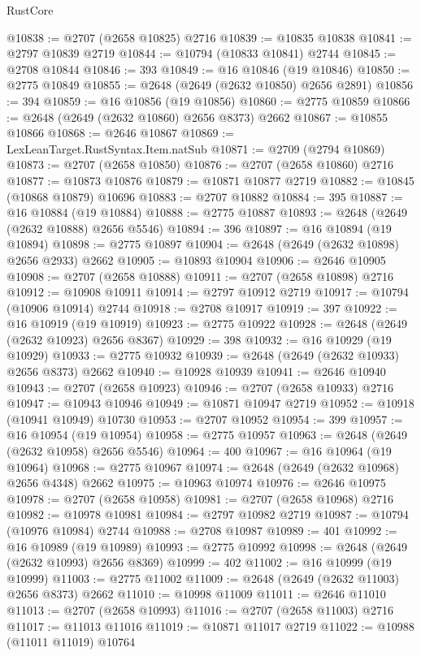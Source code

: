 \begin{lexlean}{RustCore}
\begin{coremodule}
@10838 := @2707 (@2658 @10825) @2716
@10839 := @10835 @10838
@10841 := @2797 @10839 @2719
@10844 := @10794 (@10833 @10841) @2744
@10845 := @2708 @10844
@10846 := 393
@10849 := @16 @10846 (@19 @10846)
@10850 := @2775 @10849
@10855 := @2648 (@2649 (@2632 @10850) @2656 @2891)
@10856 := 394
@10859 := @16 @10856 (@19 @10856)
@10860 := @2775 @10859
@10866 := @2648 (@2649 (@2632 @10860) @2656 @8373) @2662
@10867 := @10855 @10866
@10868 := @2646 @10867
@10869 := LexLeanTarget.RustSyntax.Item.natSub
@10871 := @2709 (@2794 @10869)
@10873 := @2707 (@2658 @10850)
@10876 := @2707 (@2658 @10860) @2716
@10877 := @10873 @10876
@10879 := @10871 @10877 @2719
@10882 := @10845 (@10868 @10879) @10696
@10883 := @2707 @10882
@10884 := 395
@10887 := @16 @10884 (@19 @10884)
@10888 := @2775 @10887
@10893 := @2648 (@2649 (@2632 @10888) @2656 @5546)
@10894 := 396
@10897 := @16 @10894 (@19 @10894)
@10898 := @2775 @10897
@10904 := @2648 (@2649 (@2632 @10898) @2656 @2933) @2662
@10905 := @10893 @10904
@10906 := @2646 @10905
@10908 := @2707 (@2658 @10888)
@10911 := @2707 (@2658 @10898) @2716
@10912 := @10908 @10911
@10914 := @2797 @10912 @2719
@10917 := @10794 (@10906 @10914) @2744
@10918 := @2708 @10917
@10919 := 397
@10922 := @16 @10919 (@19 @10919)
@10923 := @2775 @10922
@10928 := @2648 (@2649 (@2632 @10923) @2656 @8367)
@10929 := 398
@10932 := @16 @10929 (@19 @10929)
@10933 := @2775 @10932
@10939 := @2648 (@2649 (@2632 @10933) @2656 @8373) @2662
@10940 := @10928 @10939
@10941 := @2646 @10940
@10943 := @2707 (@2658 @10923)
@10946 := @2707 (@2658 @10933) @2716
@10947 := @10943 @10946
@10949 := @10871 @10947 @2719
@10952 := @10918 (@10941 @10949) @10730
@10953 := @2707 @10952
@10954 := 399
@10957 := @16 @10954 (@19 @10954)
@10958 := @2775 @10957
@10963 := @2648 (@2649 (@2632 @10958) @2656 @5546)
@10964 := 400
@10967 := @16 @10964 (@19 @10964)
@10968 := @2775 @10967
@10974 := @2648 (@2649 (@2632 @10968) @2656 @4348) @2662
@10975 := @10963 @10974
@10976 := @2646 @10975
@10978 := @2707 (@2658 @10958)
@10981 := @2707 (@2658 @10968) @2716
@10982 := @10978 @10981
@10984 := @2797 @10982 @2719
@10987 := @10794 (@10976 @10984) @2744
@10988 := @2708 @10987
@10989 := 401
@10992 := @16 @10989 (@19 @10989)
@10993 := @2775 @10992
@10998 := @2648 (@2649 (@2632 @10993) @2656 @8369)
@10999 := 402
@11002 := @16 @10999 (@19 @10999)
@11003 := @2775 @11002
@11009 := @2648 (@2649 (@2632 @11003) @2656 @8373) @2662
@11010 := @10998 @11009
@11011 := @2646 @11010
@11013 := @2707 (@2658 @10993)
@11016 := @2707 (@2658 @11003) @2716
@11017 := @11013 @11016
@11019 := @10871 @11017 @2719
@11022 := @10988 (@11011 @11019) @10764

\end{coremodule}
\end{lexlean}
